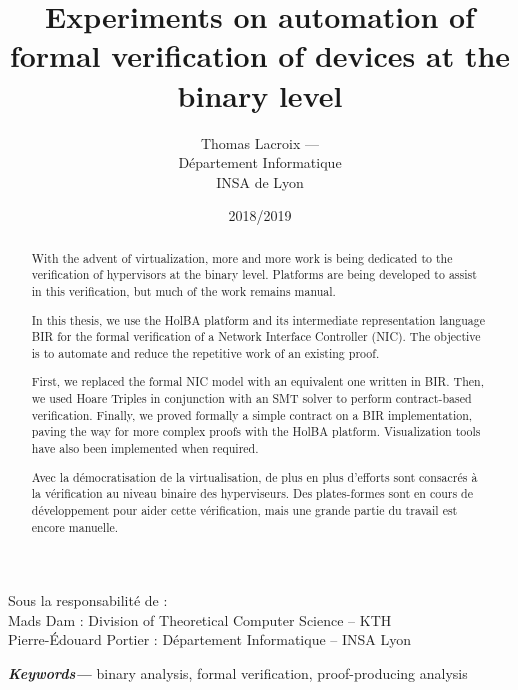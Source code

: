 \documentclass[10pt,a4paper]{article}
\title{Experiments on automation of formal verification of devices at the binary level}
\author{Thomas Lacroix --- \email{thomas.lacroix@insa-lyon.fr}\medskip\\
Département Informatique\\
INSA de Lyon}
\date{2018/2019}
\begin{document}

\maketitle
\thispagestyle{empty}

{
\noindent Sous la responsabilité de :\\
Mads Dam : Division of Theoretical Computer Science -- KTH\\
Pierre-\'Edouard Portier : Département Informatique -- INSA Lyon
}

\vspace{\baselineskip}\vspace{\baselineskip}

{ %
\fontsize{9}{10.8}

\begin{abstract}
  \rightmargin=1cm \leftmargin=1cm
  With the advent of virtualization, more and more work is being dedicated to the verification of hypervisors at the binary level. Platforms are being developed to assist in this verification, but much of the work remains manual.

  In this thesis, we use the HolBA platform and its intermediate representation language BIR for the formal verification of a Network Interface Controller (NIC). The objective is to automate and reduce the repetitive work of an existing proof.

  First, we replaced the formal NIC model with an equivalent one written in BIR. Then, we used Hoare Triples in conjunction with an SMT solver to perform contract-based verification. Finally, we proved formally a simple contract on a BIR implementation, paving the way for more complex proofs with the HolBA platform. Visualization tools have also been implemented when required.
\end{abstract}

\leftmargin=1cm
{\small\textbf{\textit{Keywords---}} binary analysis, formal verification, proof-producing analysis}

\vspace{\baselineskip}\vspace{\baselineskip}

\begin{otherlanguage}{french}
  \begin{abstract}
    \rightmargin=1cm \leftmargin=1cm
    Avec la démocratisation de la virtualisation, de plus en plus d'efforts sont consacrés à la vérification au niveau binaire des hyperviseurs. Des plates-formes sont en cours de développement pour aider cette vérification, mais une grande partie du travail est encore manuelle.


\end{abstract}
\end{otherlanguage}}
\end{document}
